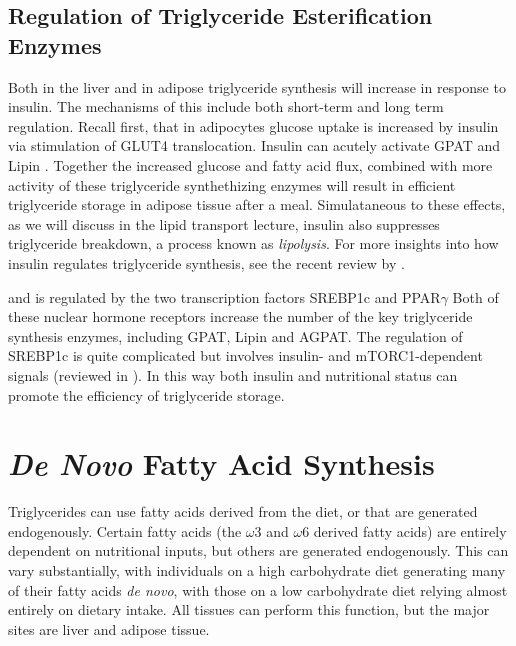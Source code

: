 \documentclass{tufte-handout}
\begin{document}
\subsection{Regulation of Triglyceride Esterification Enzymes}  

Both in the liver and in adipose triglyceride synthesis will increase in response to insulin.  The mechanisms of this include both short-term and long term regulation.  Recall first, that in adipocytes glucose uptake is increased by insulin via stimulation of GLUT4 translocation.  Insulin can acutely activate GPAT and Lipin .  Together the increased glucose and fatty acid flux, combined with more activity of these triglyceride synthethizing enzymes will result in efficient triglyceride storage in adipose tissue after a meal. Simulataneous to these effects, as we will discuss in the lipid transport lecture, insulin also suppresses triglyceride breakdown, a process known as \emph{lipolysis}.  For more insights into how insulin regulates triglyceride synthesis, see the recent review by \citet{Coleman2011}.

 and is regulated by the two transcription factors SREBP1c and PPAR$\gamma$  Both of these nuclear hormone receptors increase the number of the key triglyceride synthesis enzymes, including GPAT, Lipin and AGPAT.  The regulation of SREBP1c is quite complicated but involves insulin- and mTORC1-dependent signals (reviewed in \citet{Bakan2012}).  In this way both insulin and nutritional status can promote the efficiency of triglyceride storage.

\section{\textit{De Novo} Fatty Acid Synthesis}

Triglycerides can use fatty acids derived from the diet, or that are generated endogenously.  Certain fatty acids (the $\omega$3 and $\omega$6 derived fatty acids) are entirely dependent on nutritional inputs, but others are generated endogenously.  This can vary substantially, with individuals on a high carbohydrate diet generating many of their fatty acids \textit{de novo}, with those on a low carbohydrate diet relying almost entirely on dietary intake.  All tissues can perform this function, but the major sites are liver and adipose tissue.
\end{document}
